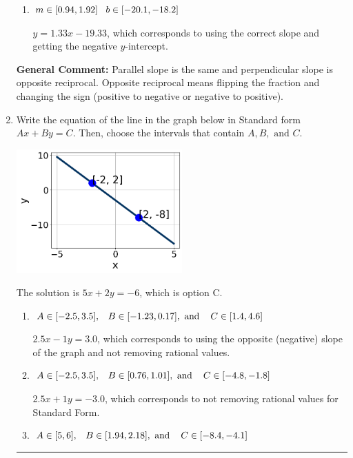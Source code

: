 \documentclass{extbook}[14pt]
\newcommand{\litem}[1]{\item #1

\rule{\textwidth}{0.4pt}}
\begin{document}
\begin{enumerate}
{\begin{enumerate}[label=\Alph*.]
 $y = 0.75x + 19.33$, which corresponds to using the reciprocal slope $(1/m)$.
\item \( m \in [0.94, 1.92] \hspace*{3mm} b \in [-20.1, -18.2] \)

 $y = 1.33x - 19.33$, which corresponds to using the correct slope and getting the negative $y$-intercept.
\end{enumerate}

\textbf{General Comment:} Parallel slope is the same and perpendicular slope is opposite reciprocal. Opposite reciprocal means flipping the fraction and changing the sign (positive to negative or negative to positive).
}
\litem{
Write the equation of the line in the graph below in Standard form $Ax+By=C$. Then, choose the intervals that contain $A, B, \text{ and } C$.

\begin{center}
    \includegraphics[width=0.5\textwidth]{../Figures/linearGraphToStandardC.png}
\end{center}




The solution is \( 5x + 2y = -6 \), which is option C.\begin{enumerate}[label=\Alph*.]
\item \( A \in [-2.5, 3.5], \hspace{3mm} B \in [-1.23, 0.17], \text{ and } \hspace{3mm} C \in [1.4, 4.6] \)

 $2.5x - 1y = 3.0$, which corresponds to using the opposite (negative) slope of the graph and not removing rational values.
\item \( A \in [-2.5, 3.5], \hspace{3mm} B \in [0.76, 1.01], \text{ and } \hspace{3mm} C \in [-4.8, -1.8] \)

 $2.5x + 1y = -3.0$, which corresponds to not removing rational values for Standard Form.
\item \( A \in [5, 6], \hspace{3mm} B \in [1.94, 2.18], \text{ and } \hspace{3mm} C \in [-8.4, -4.1] \)


\end{enumerate}}
\end{enumerate}
\end{document}
